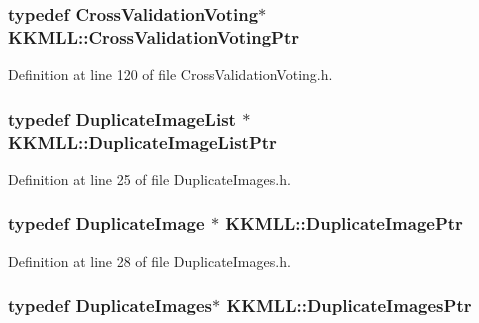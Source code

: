 \subsubsection[{\texorpdfstring{Cross\+Validation\+Voting\+Ptr}{CrossValidationVotingPtr}}]{\setlength{\rightskip}{0pt plus 5cm}typedef {\bf Cross\+Validation\+Voting}$\ast$ {\bf K\+K\+M\+L\+L\+::\+Cross\+Validation\+Voting\+Ptr}}\hypertarget{namespace_k_k_m_l_l_a221f35ca38b5daf6019c2d69aa2bd38b}{}\label{namespace_k_k_m_l_l_a221f35ca38b5daf6019c2d69aa2bd38b}


Definition at line 120 of file Cross\+Validation\+Voting.\+h.

\subsubsection[{\texorpdfstring{Duplicate\+Image\+List\+Ptr}{DuplicateImageListPtr}}]{\setlength{\rightskip}{0pt plus 5cm}typedef {\bf Duplicate\+Image\+List} $\ast$ {\bf K\+K\+M\+L\+L\+::\+Duplicate\+Image\+List\+Ptr}}\hypertarget{namespace_k_k_m_l_l_a0d6bd9e8744f7f256c866b6d88739d23}{}\label{namespace_k_k_m_l_l_a0d6bd9e8744f7f256c866b6d88739d23}


Definition at line 25 of file Duplicate\+Images.\+h.

\subsubsection[{\texorpdfstring{Duplicate\+Image\+Ptr}{DuplicateImagePtr}}]{\setlength{\rightskip}{0pt plus 5cm}typedef {\bf Duplicate\+Image} $\ast$ {\bf K\+K\+M\+L\+L\+::\+Duplicate\+Image\+Ptr}}\hypertarget{namespace_k_k_m_l_l_a55d6f703b6c805f96dc6af66f31d2be5}{}\label{namespace_k_k_m_l_l_a55d6f703b6c805f96dc6af66f31d2be5}


Definition at line 28 of file Duplicate\+Images.\+h.

\subsubsection[{\texorpdfstring{Duplicate\+Images\+Ptr}{DuplicateImagesPtr}}]{\setlength{\rightskip}{0pt plus 5cm}typedef {\bf Duplicate\+Images}$\ast$ {\bf K\+K\+M\+L\+L\+::\+Duplicate\+Images\+Ptr}}\hypertarget{namespace_k_k_m_l_l_ac205a681bc0fe894edaf427ea8add62d}{}\label{namespace_k_k_m_l_l_ac205a681bc0fe894edaf427ea8add62d}


